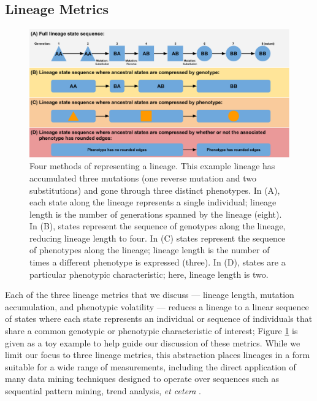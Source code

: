 \documentclass[letterpaper]{article}
\newcommand{\reduceCaptionPadding}{\setlength{\belowcaptionskip}{-10pt}}
\begin{document}
\subsection{Lineage Metrics}

\begin{figure}[t]
\includegraphics[width=\textwidth]{figs/lineage_metrics_cartoon.png}
\reduceCaptionPadding
\caption{\small Four methods of representing a lineage.  This example lineage has accumulated three mutations (one reverse mutation and two substitutions) and gone through three distinct phenotypes. In (A), each state along the lineage represents a single individual; lineage length is the number of generations spanned by the lineage (eight). In (B), states represent the sequence of genotypes along the lineage, reducing lineage length to four. In (C) states represent the sequence of phenotypes along the lineage; lineage length is the number of times a different phenotype is expressed (three). In (D), states are a particular phenotypic characteristic; here, lineage length is two.}
\label{fig:lineage_metrics_cartoon}
\end{figure}

Each of the three lineage metrics that we discuss --- lineage length, mutation accumulation, and phenotypic volatility --- reduces a lineage to a linear sequence of states where each state represents an individual or sequence of individuals that share a common genotypic or phenotypic characteristic of interest; Figure \ref{fig:lineage_metrics_cartoon} is given as a toy example to help guide our discussion of these metrics. 
While we limit our focus to three lineage metrics, this abstraction places lineages in a form suitable for a wide range of measurements, including the direct application of many data mining techniques designed to operate over sequences such as sequential pattern mining, trend analysis, \textit{et cetera} \citep{han2011data}. 
\end{document}
